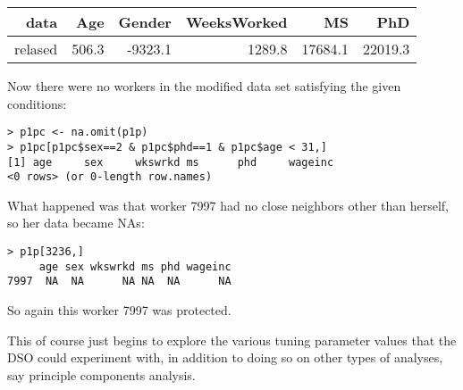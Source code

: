 \documentclass[11pt]{article}
\begin{document}
\begin{tabular}{|r|r|r|r|r|r|}
\hline
data & Age & Gender & WeeksWorked & MS & PhD \\ \hline 
relased & 506.3  & -9323.1  & 1289.8 & 17684.1 & 22019.3 \\ \hline 
\end{tabular}

Now there were no workers in the modified data set satisfying
the given conditions: 

\begin{lstlisting}
> p1pc <- na.omit(p1p) 
> p1pc[p1pc$sex==2 & p1pc$phd==1 & p1pc$age < 31,]
[1] age     sex     wkswrkd ms      phd     wageinc
<0 rows> (or 0-length row.names)
\end{lstlisting}

What happened was that worker 7997 had no close neighbors other than
herself, so her data became NAs:

\begin{lstlisting}
> p1p[3236,]
     age sex wkswrkd ms phd wageinc
7997  NA  NA      NA NA  NA      NA
\end{lstlisting}

So again this worker 7997 was protected.

This of course just begins to explore the various tuning
parameter values that the DSO could experiment with, in addition to
doing so on other types of analyses, say principle components analysis.




\end{document}
